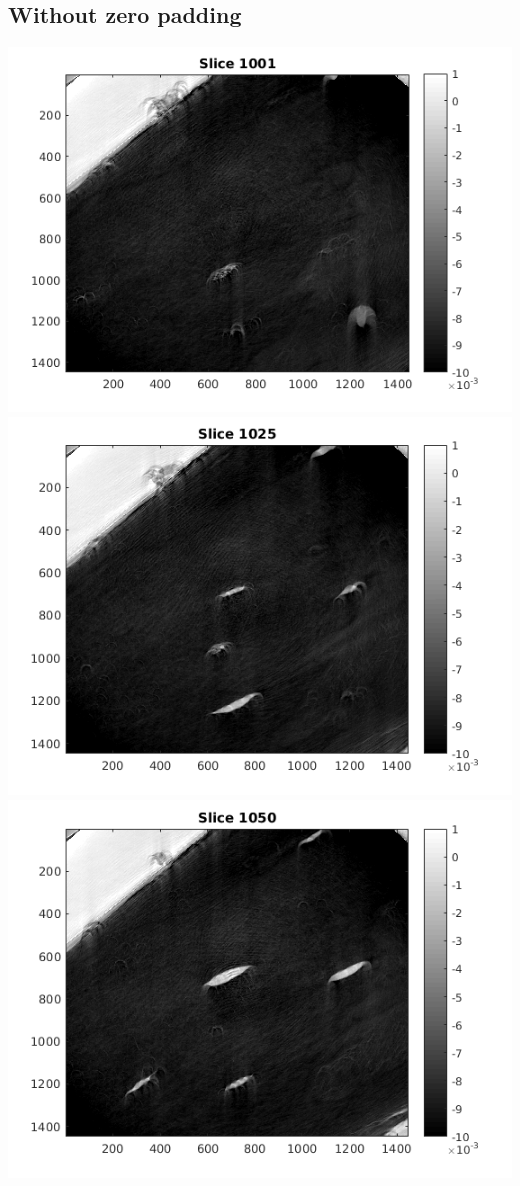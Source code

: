 \documentclass[10pt,a4paper,titlepage]{article}
\begin{document}
    \subsection{Without zero padding}
        \label{wtout0pad}
        \includegraphics[width=\textwidth]{no0pad/slice1001.png}
        \includegraphics[width=\textwidth]{no0pad/slice1025.png}
        \includegraphics[width=\textwidth]{no0pad/slice1050.png}
\end{document}
